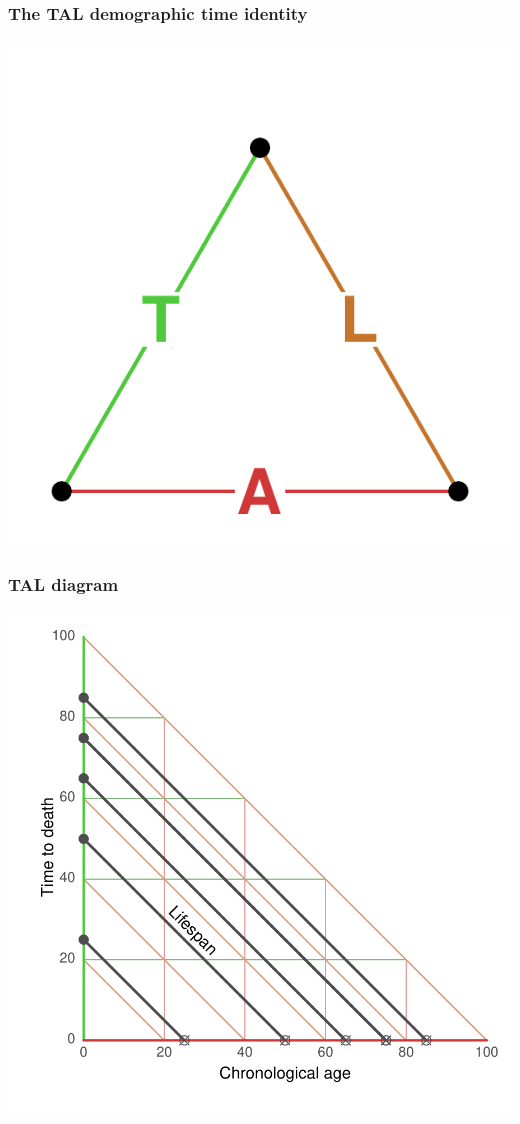 \documentclass[20pt]{beamer}
\begin{document}

\begin{frame}
\frametitle{The TAL demographic time identity}
\vspace{-4em}
\begin{center}
\includegraphics[scale=1.7]{Figures/TALid.pdf}
\end{center}
\end{frame}


\begin{frame}
\frametitle{TAL diagram}
\begin{center}
\includegraphics[scale=1.1]{Figures/TALrt.pdf}
\end{center}
\end{frame}
\end{document}
